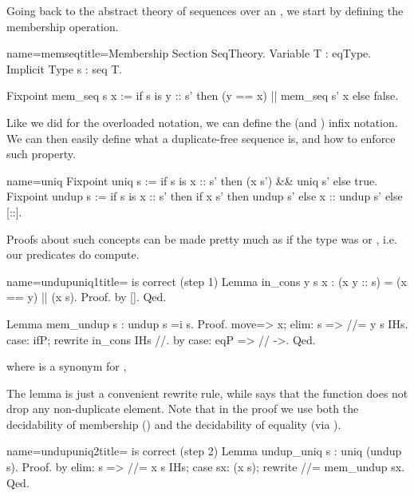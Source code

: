 Going back to the abstract theory of sequences over an ,
we start by defining the membership operation.

\begin{coq}{name=memseq}{title=Membership}
Section SeqTheory.
Variable T : eqType.
Implicit Type s : seq T.

Fixpoint mem_seq s x :=
  if s is y :: s' then (y == x) || mem_seq s' x else false.
\end{coq}

Like we did for the overloaded \C{==} notation, we can define the
\C{\\in} (and \C{\\notin}) infix notation.  We can then easily
define what a duplicate-free sequence is, and how to enforce such
property.

\begin{coq}{name=uniq}{}
Fixpoint uniq s :=
  if s is x :: s' then (x \notin s') && uniq s' else true.
Fixpoint undup s :=
  if s is x :: s' then
    if x \in s' then undup s' else x :: undup s'
  else [::].
\end{coq}

Proofs about such concepts can be made pretty much as if
the type  was  or , i.e. our predicates do
compute.

\begin{coq}{name=undupuniq1}{title= is correct (step 1)}
Lemma in_cons y s x : (x \in y :: s) = (x == y) || (x \in s).
Proof. by []. Qed.

Lemma mem_undup s : undup s =i s.
Proof.
move=> x; elim: s => //= y s IHs.
case: ifP; rewrite in_cons IHs //.
by case: eqP => // ->.
Qed.
\end{coq}
where  is a synonym for ,

The  lemma is just a convenient rewrite rule, while
 says that the  function does not drop
any non-duplicate element.  Note that in the proof we use both
the decidability of membership () and the decidability of
equality (via ).

\begin{coq}{name=undupuniq2}{title= is correct (step 2)}
Lemma undup_uniq s : uniq (undup s).
Proof.
by elim: s => //= x s IHs; case sx: (x \in s); rewrite //= mem_undup sx.
Qed.
\end{coq}


